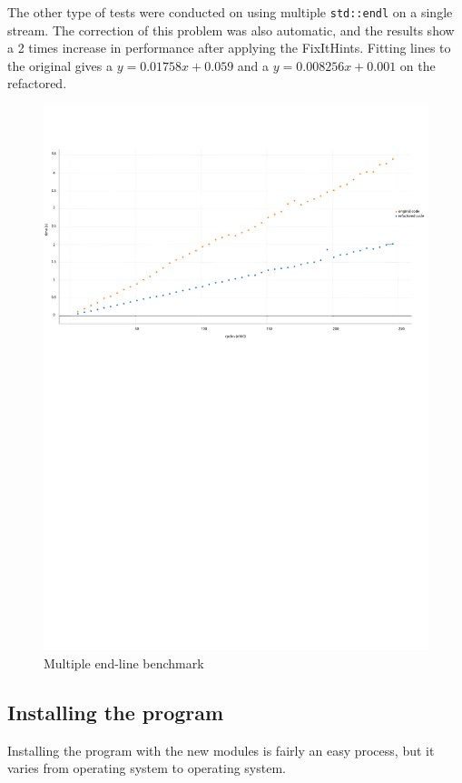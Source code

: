 \par The other type of tests were conducted on using multiple \verb|std::endl| on a single stream. The correction of this problem was also automatic, and the results show a 2 times increase in performance after applying the FixItHints. Fitting lines to the original gives a $y=0.01758x+0.059$ and a $y=0.008256x+0.001$ on the refactored. 
\begin{figure}[H]
	\caption{Multiple end-line benchmark}
	\includegraphics[scale=0.7]{images/stream_endline_performance.pdf}
\end{figure}
\subsection{Installing the program}
Installing the program with the new modules is fairly an easy process, but it varies from operating system to operating system.
